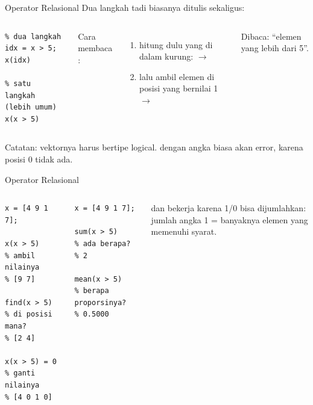 \documentclass[t,aspectratio=169,11pt]{beamer}
\newcommand{\cc}[1]{\texttt{\detokenize{#1}}}
\begin{document}
\begin{frame}[fragile]{Operator Relasional}
Dua langkah tadi biasanya ditulis sekaligus:

\begin{columns}[T]
\begin{lstlisting}
% dua langkah
idx = x > 5;
x(idx)

% satu langkah (lebih umum)
x(x > 5)
\end{lstlisting}
\small Cara membaca \cc{x(x > 5)}:
\begin{enumerate}
\item hitung dulu yang di dalam kurung: \cc{x > 5} $\to$ \cc{[0 1 0 1]}
\item lalu ambil elemen \cc{x} di posisi yang bernilai 1 $\to$ \cc{[9 7]}
\end{enumerate}
\vspace{4pt}
Dibaca: ``elemen \cc{x} yang lebih dari 5''.
\end{columns}

\vspace{6pt}
\small Catatan: vektornya harus bertipe logical. \cc{x([0 1 0 1])} dengan angka biasa akan error, karena posisi 0 tidak ada.
\end{frame}

\begin{frame}[fragile]{Operator Relasional}
\begin{columns}[T]
\begin{lstlisting}
x = [4 9 1 7];

x(x > 5)       % ambil nilainya
% [9 7]

find(x > 5)    % di posisi mana?
% [2 4]

x(x > 5) = 0   % ganti nilainya
% [4 0 1 0]
\end{lstlisting}
\begin{lstlisting}
x = [4 9 1 7];

sum(x > 5)     % ada berapa?
% 2

mean(x > 5)    % berapa proporsinya?
% 0.5000
\end{lstlisting}
\small \cc{sum} dan \cc{mean} bekerja karena 1/0 bisa dijumlahkan: jumlah angka 1 = banyaknya elemen yang memenuhi syarat.
\end{columns}
\end{frame}
\end{document}
